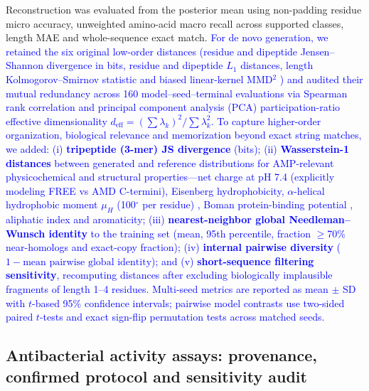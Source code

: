\documentclass[unnumsec,webpdf,contemporary,large]{oup-authoring-template}
\newcommand{\rev}[1]{\textcolor{blue}{#1}}
\begin{document}
Reconstruction was evaluated from the posterior mean using non-padding residue micro accuracy, unweighted amino-acid macro recall across supported classes, length MAE and whole-sequence exact match. \rev{For de novo generation, we retained the six original low-order distances (residue and dipeptide Jensen--Shannon divergence \cite{refJS} in bits, residue and dipeptide $L_1$ distances, length Kolmogorov--Smirnov statistic and biased linear-kernel MMD$^2$ \cite{refMMD}) and audited their mutual redundancy across 160 model--seed--terminal evaluations via Spearman rank correlation and principal component analysis (PCA) participation-ratio effective dimensionality $d_{\mathrm{eff}} = (\sum \lambda_k)^2 / \sum \lambda_k^2$. To capture higher-order organization, biological relevance and memorization beyond exact string matches, we added: (i) \textbf{tripeptide (3-mer) JS divergence} (bits); (ii) \textbf{Wasserstein-1 distances} between generated and reference distributions for AMP-relevant physicochemical and structural properties---net charge at pH 7.4 (explicitly modeling FREE vs AMD C-termini), Eisenberg hydrophobicity, $\alpha$-helical hydrophobic moment $\mu_H$ (100$^\circ$ per residue) \cite{refEisenberg}, Boman protein-binding potential \cite{refBoman}, aliphatic index and aromaticity; (iii) \textbf{nearest-neighbor global Needleman--Wunsch identity} to the training set (mean, 95th percentile, fraction $\geq$70\% near-homologs and exact-copy fraction); (iv) \textbf{internal pairwise diversity} ($1 - \text{mean pairwise global identity}$); and (v) \textbf{short-sequence filtering sensitivity}, recomputing distances after excluding biologically implausible fragments of length 1--4 residues. Multi-seed metrics are reported as mean $\pm$ SD with $t$-based 95\% confidence intervals; pairwise model contrasts use two-sided paired $t$-tests and exact sign-flip permutation tests across matched seeds.}

\subsection{Antibacterial activity assays: provenance, confirmed protocol and sensitivity audit}
\end{document}
